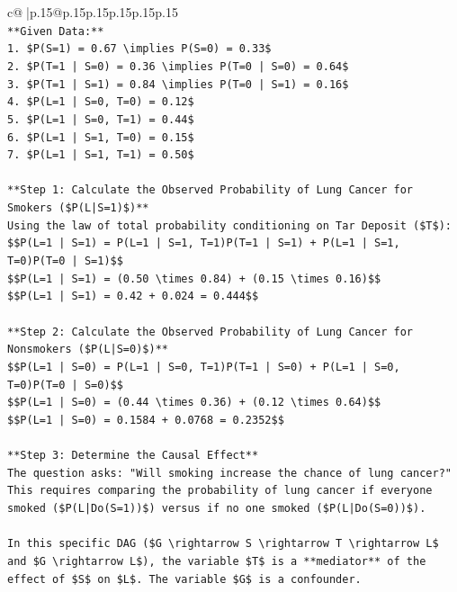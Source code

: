 \documentclass{article}
\begin{document}
{\begin{supertabular}{c@{$\;$}|p{.15\linewidth}@{}p{.15\linewidth}p{.15\linewidth}p{.15\linewidth}p{.15\linewidth}p{.15\linewidth}}
{{{\\ 
\texttt{**Given Data:**} \\
\texttt{1.  \$P(S=1) = 0.67 \textbackslash{}implies P(S=0) = 0.33\$} \\
\texttt{2.  \$P(T=1 | S=0) = 0.36 \textbackslash{}implies P(T=0 | S=0) = 0.64\$} \\
\texttt{3.  \$P(T=1 | S=1) = 0.84 \textbackslash{}implies P(T=0 | S=1) = 0.16\$} \\
\texttt{4.  \$P(L=1 | S=0, T=0) = 0.12\$} \\
\texttt{5.  \$P(L=1 | S=0, T=1) = 0.44\$} \\
\texttt{6.  \$P(L=1 | S=1, T=0) = 0.15\$} \\
\texttt{7.  \$P(L=1 | S=1, T=1) = 0.50\$} \\
\\ 
\texttt{**Step 1: Calculate the Observed Probability of Lung Cancer for Smokers (\$P(L|S=1)\$)**} \\
\texttt{Using the law of total probability conditioning on Tar Deposit (\$T\$):} \\
\texttt{\$\$P(L=1 | S=1) = P(L=1 | S=1, T=1)P(T=1 | S=1) + P(L=1 | S=1, T=0)P(T=0 | S=1)\$\$} \\
\texttt{\$\$P(L=1 | S=1) = (0.50 \textbackslash{}times 0.84) + (0.15 \textbackslash{}times 0.16)\$\$} \\
\texttt{\$\$P(L=1 | S=1) = 0.42 + 0.024 = 0.444\$\$} \\
\\ 
\texttt{**Step 2: Calculate the Observed Probability of Lung Cancer for Nonsmokers (\$P(L|S=0)\$)**} \\
\texttt{\$\$P(L=1 | S=0) = P(L=1 | S=0, T=1)P(T=1 | S=0) + P(L=1 | S=0, T=0)P(T=0 | S=0)\$\$} \\
\texttt{\$\$P(L=1 | S=0) = (0.44 \textbackslash{}times 0.36) + (0.12 \textbackslash{}times 0.64)\$\$} \\
\texttt{\$\$P(L=1 | S=0) = 0.1584 + 0.0768 = 0.2352\$\$} \\
\\ 
\texttt{**Step 3: Determine the Causal Effect**} \\
\texttt{The question asks: "Will smoking increase the chance of lung cancer?" This requires comparing the probability of lung cancer if everyone smoked (\$P(L|Do(S=1))\$) versus if no one smoked (\$P(L|Do(S=0))\$).} \\
\\ 
\texttt{In this specific DAG (\$G \textbackslash{}rightarrow S \textbackslash{}rightarrow T \textbackslash{}rightarrow L\$ and \$G \textbackslash{}rightarrow L\$), the variable \$T\$ is a **mediator** of the effect of \$S\$ on \$L\$. The variable \$G\$ is a confounder.} \\
}}}
\end{supertabular}}
\end{document}
